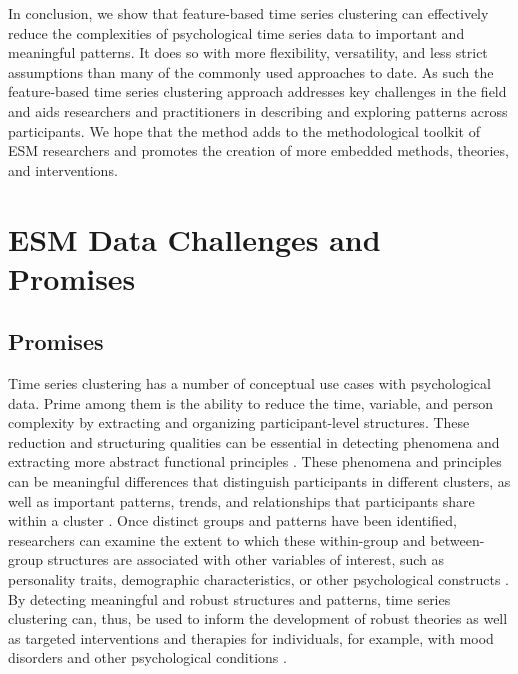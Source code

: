 \documentclass[man, 12pt, a4paper, mask, floatsintext]{apa7}
\theoremstyle{break}
\theoremstyle{plain}
\begin{document}
In conclusion, we show that feature-based time series clustering can effectively reduce the complexities of psychological time series data to important and meaningful patterns. It does so with more flexibility, versatility, and less strict assumptions than many of the commonly used approaches to date. As such the feature-based time series clustering approach addresses key challenges in the field and aids researchers and practitioners in describing and exploring patterns across participants. We hope that the method adds to the methodological toolkit of ESM researchers and promotes the creation of more embedded methods, theories, and interventions.


%




\printbibliography

\appendix

\section{ESM Data Challenges and Promises}
\label{app:ChallengesAppendix}

\subsection{Promises}

Time series clustering has a number of conceptual use cases with psychological data. Prime among them is the ability to reduce the time, variable, and person complexity by extracting and organizing participant-level structures. These reduction and structuring qualities can be essential in detecting phenomena and extracting more abstract functional principles \citep[][]{eronen2021a}. These phenomena and principles can be meaningful differences that distinguish participants in different clusters, as well as important patterns, trends, and relationships that participants share within a cluster \citep[e.g.,][]{schrodt2000}. Once distinct groups and patterns have been identified, researchers can examine the extent to which these within-group and between-group structures are associated with other variables of interest, such as personality traits, demographic characteristics, or other psychological constructs \citep[e.g.,][]{monden2022}. By detecting meaningful and robust structures and patterns, time series clustering can, thus, be used to inform the development of robust theories as well as targeted interventions and therapies for individuals, for example, with mood disorders and other psychological conditions \citep[e.g.,][]{borsboom2021, eronen2020}.
\end{document}
